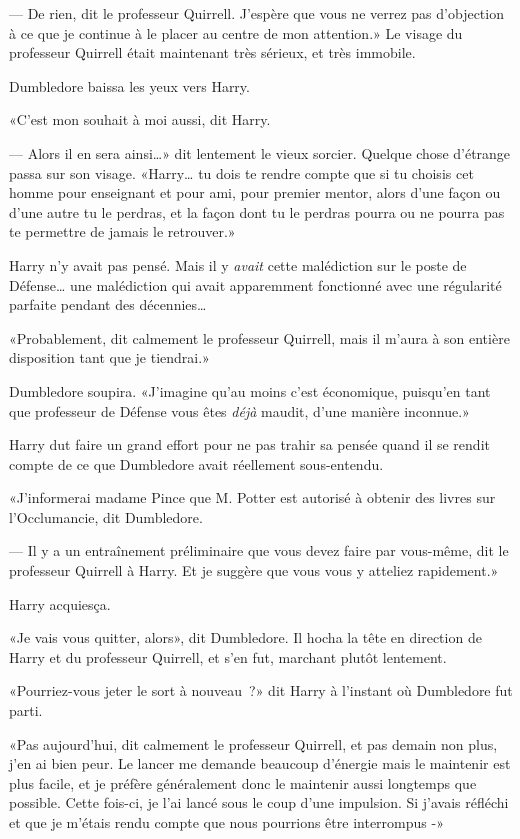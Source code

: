 --- De rien, dit le professeur Quirrell. J'espère que vous ne verrez pas d'objection à ce que je continue à le placer au centre de mon attention.» Le visage du professeur Quirrell était maintenant très sérieux, et très immobile.

Dumbledore baissa les yeux vers Harry.

«C'est mon souhait à moi aussi, dit Harry.

--- Alors il en sera ainsi…» dit lentement le vieux sorcier. Quelque chose d'étrange passa sur son visage. «Harry… tu dois te rendre compte que si tu choisis cet homme pour enseignant et pour ami, pour premier mentor, alors d'une façon ou d'une autre tu le perdras, et la façon dont tu le perdras pourra ou ne pourra pas te permettre de jamais le retrouver.»

Harry n'y avait pas pensé. Mais il y \emph{avait} cette malédiction sur le poste de Défense… une malédiction qui avait apparemment fonctionné avec une régularité parfaite pendant des décennies…

«Probablement, dit calmement le professeur Quirrell, mais il m'aura à son entière disposition tant que je tiendrai.»

Dumbledore soupira. «J'imagine qu'au moins c'est économique, puisqu'en tant que professeur de Défense vous êtes \emph{déjà} maudit, d'une manière inconnue.»

Harry dut faire un grand effort pour ne pas trahir sa pensée quand il se rendit compte de ce que Dumbledore avait réellement sous-entendu.

«J'informerai madame Pince que M. Potter est autorisé à obtenir des livres sur l'Occlumancie, dit Dumbledore.

--- Il y a un entraînement préliminaire que vous devez faire par vous-même, dit le professeur Quirrell à Harry. Et je suggère que vous vous y atteliez rapidement.»

Harry acquiesça.

«Je vais vous quitter, alors», dit Dumbledore. Il hocha la tête en direction de Harry et du professeur Quirrell, et s'en fut, marchant plutôt lentement.

«Pourriez-vous jeter le sort à nouveau~?» dit Harry à l'instant où Dumbledore fut parti.

«Pas aujourd'hui, dit calmement le professeur Quirrell, et pas demain non plus, j'en ai bien peur. Le lancer me demande beaucoup d'énergie mais le maintenir est plus facile, et je préfère généralement donc le maintenir aussi longtemps que possible. Cette fois-ci, je l'ai lancé sous le coup d'une impulsion. Si j'avais réfléchi et que je m'étais rendu compte que nous pourrions être interrompus -»

